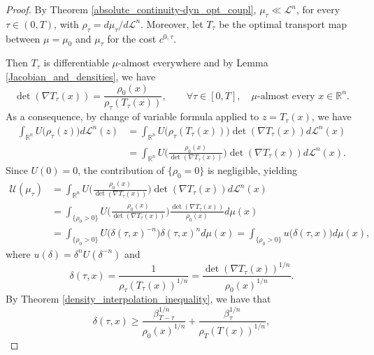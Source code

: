 \documentclass[reqno]{amsart}
\theoremstyle{plain}
\theoremstyle{definition}
\theoremstyle{remark}
\begin{document}
		\begin{proof}
			By Theorem \ref{absolute_continuity-dyn_opt_coupl}, $\mu_\tau\ll\mathscr{L}^n$, for every $\tau\in (0,T)$, with $\rho_\tau=d\mu_\tau/d\mathscr{L}^n$. Moreover, let $T_\tau$ be the optimal transport map between $\mu=\mu_0$ and $\mu_\tau$ for the cost $c^{0,\tau}$.
            
			Then $T_\tau$ is differentiable $\mu$-almost everywhere and by Lemma \ref{Jacobian_and_densities}, we have 
			\begin{equation}
				\det(\nabla T_\tau(x))=\frac{\rho_0(x)}{\rho_\tau(T_\tau(x))},\qquad\forall \tau\in[0,T],\quad\mu\text{-almost every }x\in\mathbb{R}^n.
			\end{equation}
			As a consequence, by change of variable formula applied to $z=T_\tau(x)$, we have 
			\begin{align}
				\int_{\mathbb{R}^n}U\big(\rho_\tau(z)\big)d\mathscr{L}^n(z)&=\int_{\mathbb{R}^n}U\big(\rho_\tau(T_\tau(x))\big)\det(\nabla T_\tau(x))d\mathscr{L}^n(x)\\
				&=\int_{\mathbb{R}^n}U\bigg(\frac{\rho_0(x)}{\det(\nabla T_\tau(x))}\bigg)\det(\nabla T_\tau(x))d\mathscr{L}^n(x).
			\end{align}
			Since $U(0)=0$, the contribution of $\{\rho_0=0\}$ is negligible, yielding 
			\begin{align}
				\mathcal{U}(\mu_\tau)&=\int_{\mathbb{R}^n}U\bigg(\frac{\rho_0(x)}{\det(\nabla T_\tau(x))}\bigg)\det(\nabla T_\tau(x))d\mathscr{L}^n(x)\\
				&=\int_{\{\rho_0>0\}}U\bigg(\frac{\rho_0(x)}{\det(\nabla T_\tau(x))}\bigg)\frac{\det(\nabla T_\tau(x))}{\rho_0(x)}d\mu(x)\\
				&=\int_{\{\rho_0>0\}}U\big(\delta(\tau,x)^{-n}\big)\delta(\tau,x)^{n}d\mu(x)
                =\int_{\{\rho_0>0\}}u\big(\delta(\tau,x)\big)d\mu(x),
			\end{align}
			where $u(\delta)=\delta^{n}U(\delta^{-n})$ and 
			\begin{equation}
				\delta(\tau,x)=\frac{1}{\rho_\tau(T_\tau(x))^{1/n}}=\frac{\det(\nabla T_\tau(x))^{1/n}}{\rho_0(x)^{1/n}}.
			\end{equation} 
			By Theorem \ref{density_interpolation_inequality}, we have that
			\begin{equation}
				\delta(\tau,x)\geq\frac{\beta_{T-\tau}^{1/n}}{\rho_0(x)^{1/n}} +\frac{\beta_{\tau}^{1/n}}{\rho_T(T(x))^{1/n}},

\end{equation}
\end{proof}
\end{document}
